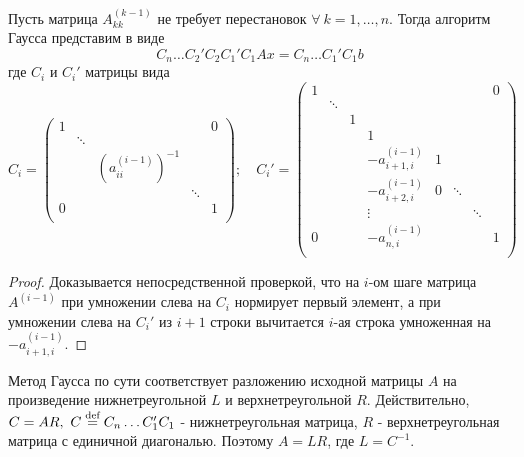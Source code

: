 \begin{theorem}
  Пусть матрица $A_{kk}^{(k-1)}$ не требует перестановок $\forall\ k=1,\ldots,n$.
  Тогда алгоритм Гаусса представим в виде
  \[C_n\ldots C_2'C_2C_1'C_1Ax=C_n\ldots C_1'C_1b\]
  где $C_i$ и $C_i'$ матрицы вида
  \[C_i=\left(\begin{array}{ccccc}
        1 &        &                       &        & 0 \\
          & \ddots &                       &        &   \\
          &        & (a_{ii}^{(i-1)})^{-1} &        &   \\
          &        &                       & \ddots &   \\
        0 &        &                       &        & 1 \\
      \end{array}\right);\quad
    C_i'=\left(\begin{array}{cccccccc}
        1 &        &   &                    &   &        &        & 0 \\
          & \ddots &   &                    &   &        &        &   \\
          &        & 1 &                    &   &        &        &   \\
          &        &   & 1                  &   &        &        &   \\
          &        &   & -a^{(i-1)}_{i+1,i} & 1 &        &        &   \\
          &        &   & -a^{(i-1)}_{i+2,i} & 0 & \ddots &        &   \\
          &        &   & \vdots             &   &        & \ddots &   \\
        0 &        &   & -a^{(i-1)}_{n,i}   &   &        &        & 1 \\
      \end{array}\right)\quad
  \]
\end{theorem}
\begin{proof}
  Доказывается непосредственной проверкой, что на $i$-ом
  шаге матрица $A^{(i-1)}$ при умножении слева на $C_i$ нормирует
  первый элемент, а при умножении слева на $C_i'$ из $i+1$ строки
  вычитается $i$-ая строка умноженная на $-a_{i+1,i}^{(i-1)}$.
\end{proof}

Метод Гаусса по сути соответствует разложению исходной матрицы
$A$ на произведение нижнетреугольной $L$ и верхнетреугольной $R$.
Действительно, $C=AR,\ C\stackrel{\text{def}}{=} C_n\ldots C_1'C_1$ - нижнетреугольная матрица,
$R$ - верхнетреугольная матрица с единичной диагональю.
Поэтому $A = LR$, где $L=C^{-1}$.

